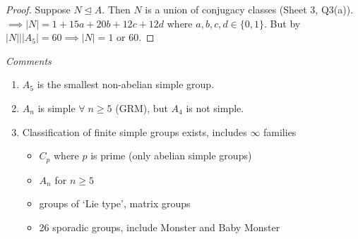 \begin{proof}
    Suppose $N \trianglelefteq A$.
    Then $N$ is a union of conjugacy classes (Sheet 3, Q3(a)). \\
    $\implies |N| = 1 + 15a + 20b + 12c + 12d$ where $a, b, c, d \in \{0, 1\}$.
    But by  $|N| \bigg| |A_5| = 60 \implies |N| = 1 \text{ or } 60$.
\end{proof} 

\emph{Comments}

\begin{enumerate}
    \item $A_5$ is the smallest non-abelian simple group.
    \item $A_n$ is simple $\forall \; n \geq 5$ (GRM), but $A_4$ is not simple.
    \item Classification of finite simple groups exists, includes $\infty$ families
    \begin{itemize}
        \item $C_p$ where $p$ is prime (only abelian simple groups) 
        \item $A_n$ for $n \geq 5$
        \item groups of `Lie type', matrix groups
        \item 26 sporadic groups, include Monster and Baby Monster
    \end{itemize} 
\end{enumerate} 